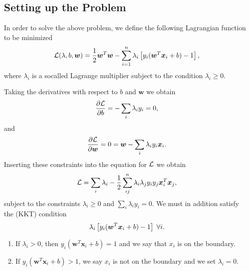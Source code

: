 \documentclass[letterpaper,10pt,english]{sphinxmanual}
\begin{document}
\subsection{Setting up the Problem}
\label{\detokenize{chapter7:setting-up-the-problem}}
In order to solve the above problem, we define the following Lagrangian function to be minimized
\begin{equation*}
\begin{split}
{\cal L}(\lambda,b,\boldsymbol{w})=\frac{1}{2}\boldsymbol{w}^T\boldsymbol{w}-\sum_{i=1}^n\lambda_i\left[y_i(\boldsymbol{w}^T\boldsymbol{x}_i+b)-1\right],
\end{split}
\end{equation*}
where \(\lambda_i\) is a so\sphinxhyphen{}called Lagrange multiplier subject to the condition \(\lambda_i \geq 0\).

Taking the derivatives  with respect to \(b\) and \(\boldsymbol{w}\) we obtain
\begin{equation*}
\begin{split}
\frac{\partial {\cal L}}{\partial b} = -\sum_{i} \lambda_iy_i=0,
\end{split}
\end{equation*}
and
\begin{equation*}
\begin{split}
\frac{\partial {\cal L}}{\partial \boldsymbol{w}} = 0 = \boldsymbol{w}-\sum_{i} \lambda_iy_i\boldsymbol{x}_i.
\end{split}
\end{equation*}
Inserting these constraints into the equation for \({\cal L}\) we obtain
\begin{equation*}
\begin{split}
{\cal L}=\sum_i\lambda_i-\frac{1}{2}\sum_{ij}^n\lambda_i\lambda_jy_iy_j\boldsymbol{x}_i^T\boldsymbol{x}_j,
\end{split}
\end{equation*}
subject to the constraints \(\lambda_i\geq 0\) and \(\sum_i\lambda_iy_i=0\).
We must in addition satisfy the  (KKT) condition
\begin{equation*}
\begin{split}
\lambda_i\left[y_i(\boldsymbol{w}^T\boldsymbol{x}_i+b) -1\right] \hspace{0.1cm}\forall i.
\end{split}
\end{equation*}\begin{enumerate}
%
\item {} 
If \(\lambda_i > 0\), then \(y_i(\boldsymbol{w}^T\boldsymbol{x}_i+b)=1\) and we say that \(x_i\) is on the boundary.

\item {} 
If \(y_i(\boldsymbol{w}^T\boldsymbol{x}_i+b)> 1\), we say \(x_i\) is not on the boundary and we set \(\lambda_i=0\).

\end{enumerate}
\end{document}
